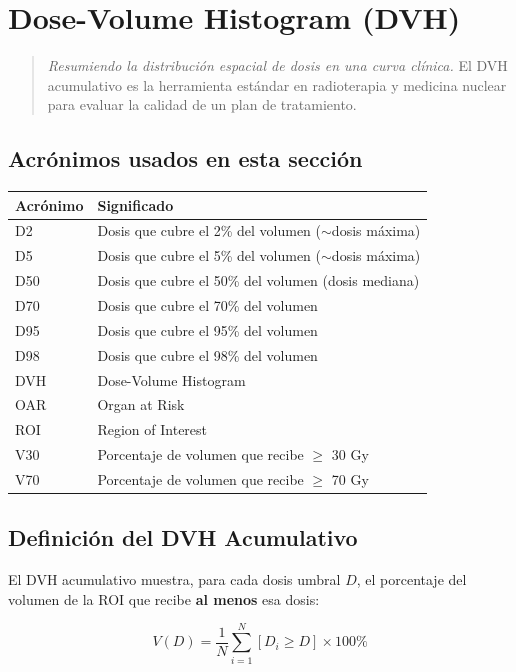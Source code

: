 \documentclass[12pt,a4paper]{article}
\begin{document}
\section{Dose-Volume Histogram (DVH)}

\begin{quote}
\textit{Resumiendo la distribución espacial de dosis en una curva clínica.} El DVH acumulativo es la herramienta estándar en radioterapia y medicina nuclear para evaluar la calidad de un plan de tratamiento.
\end{quote}

\subsection*{Acrónimos usados en esta sección}

\begin{tabular}{p{3cm} p{12cm}}
\toprule
\textbf{Acrónimo} & \textbf{Significado} \\
\midrule
D2 & Dosis que cubre el 2\% del volumen ($\sim$dosis máxima) \\
D5 & Dosis que cubre el 5\% del volumen ($\sim$dosis máxima) \\
D50 & Dosis que cubre el 50\% del volumen (dosis mediana) \\
D70 & Dosis que cubre el 70\% del volumen \\
D95 & Dosis que cubre el 95\% del volumen \\
D98 & Dosis que cubre el 98\% del volumen \\
DVH & Dose-Volume Histogram \\
OAR & Organ at Risk \\
ROI & Region of Interest \\
V30 & Porcentaje de volumen que recibe $\geq$ 30 Gy \\
V70 & Porcentaje de volumen que recibe $\geq$ 70 Gy \\
\bottomrule
\end{tabular}

\subsection{Definición del DVH Acumulativo}

El DVH acumulativo muestra, para cada dosis umbral $D$, el porcentaje del volumen de la ROI que recibe \textbf{al menos} esa dosis:

$$V(D) = \frac{1}{N}\sum_{i=1}^{N} [D_i \geq D] \times 100\%$$
\end{document}
